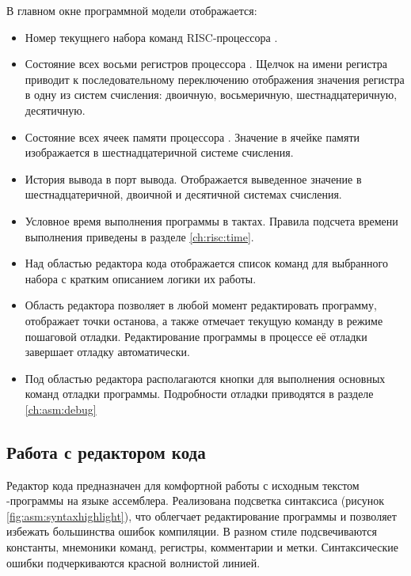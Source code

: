 В главном окне программной модели отображается:
\begin{itemize}
    \item Номер текущнего набора команд RISC-процессора \MyProc.
    
    \item Состояние всех восьми регистров процессора \MyProc. Щелчок на имени регистра приводит к последовательному переключению отображения значения регистра в одну из систем счисления: двоичную, восьмеричную, шестнадцатеричную, десятичную.
    
    \item Состояние всех ячеек памяти процессора \MyProc. Значение в ячейке памяти изображается в шестнадцатеричной системе счисления.
    
    \item История вывода в порт вывода. Отображается выведенное значение в шестнадцатеричной, двоичной и десятичной системах счисления.
    
    \item Условное время выполнения программы в тактах. Правила подсчета времени выполнения приведены в разделе \ref{ch:risc:time}.
    
    \item Над областью редактора кода отображается список команд для выбранного набора с кратким описанием логики их работы.
    
    \item Область редактора позволяет в любой момент редактировать программу, отображает точки останова, а также отмечает текущую команду в режиме пошаговой отладки. Редактирование программы в процессе её отладки завершает отладку автоматически.
    
    \item Под областью редактора располагаются кнопки для выполнения основных команд отладки программы. Подробности отладки приводятся в разделе \ref{ch:asm:debug}
\end{itemize}


\subsection{Работа с редактором кода}

Редактор кода предназначен для комфортной работы с исходным текстом \MyProc-программы на языке ассемблера. Реализована подсветка синтаксиса (рисунок \ref{fig:asm:syntaxhighlight}), что облегчает редактирование программы и позволяет избежать большинства ошибок компиляции. В разном стиле подсвечиваются константы, мнемоники команд, регистры, комментарии и метки. Синтаксические ошибки подчеркиваются красной волнистой линией.

